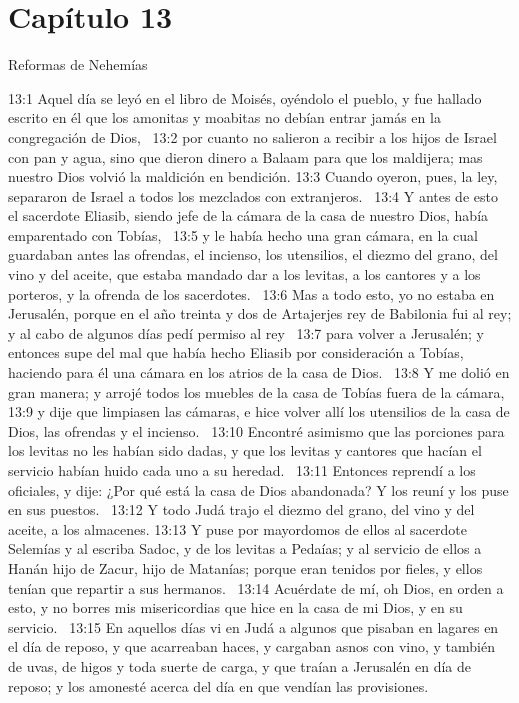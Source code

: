 \section*{Capítulo 13}
Reformas de Nehemías  

13:1 Aquel día se leyó en el libro de Moisés, oyéndolo el pueblo, y fue hallado escrito en él que los amonitas y moabitas no debían entrar jamás en la congregación de Dios,  
13:2 por cuanto no salieron a recibir a los hijos de Israel con pan y agua, sino que dieron dinero a Balaam para que los maldijera; mas nuestro Dios volvió la maldición en bendición. 
13:3 Cuando oyeron, pues, la ley, separaron de Israel a todos los mezclados con extranjeros.  
13:4 Y antes de esto el sacerdote Eliasib, siendo jefe de la cámara de la casa de nuestro Dios, había emparentado con Tobías,  
13:5 y le había hecho una gran cámara, en la cual guardaban antes las ofrendas, el incienso, los utensilios, el diezmo del grano, del vino y del aceite, que estaba mandado dar a los levitas, a los cantores y a los porteros, y la ofrenda de los sacerdotes.  
13:6 Mas a todo esto, yo no estaba en Jerusalén, porque en el año treinta y dos de Artajerjes rey de Babilonia fui al rey; y al cabo de algunos días pedí permiso al rey  
13:7 para volver a Jerusalén; y entonces supe del mal que había hecho Eliasib por consideración a Tobías, haciendo para él una cámara en los atrios de la casa de Dios.  
13:8 Y me dolió en gran manera; y arrojé todos los muebles de la casa de Tobías fuera de la cámara,  
13:9 y dije que limpiasen las cámaras, e hice volver allí los utensilios de la casa de Dios, las ofrendas y el incienso.  
13:10 Encontré asimismo que las porciones para los levitas no les habían sido dadas, y que los levitas y cantores que hacían el servicio habían huido cada uno a su heredad.  
13:11 Entonces reprendí a los oficiales, y dije: ¿Por qué está la casa de Dios abandonada? Y los reuní y los puse en sus puestos.  
13:12 Y todo Judá trajo el diezmo del grano, del vino y del aceite, a los almacenes. 
13:13 Y puse por mayordomos de ellos al sacerdote Selemías y al escriba Sadoc, y de los levitas a Pedaías; y al servicio de ellos a Hanán hijo de Zacur, hijo de Matanías; porque eran tenidos por fieles, y ellos tenían que repartir a sus hermanos.  
13:14 Acuérdate de mí, oh Dios, en orden a esto, y no borres mis misericordias que hice en la casa de mi Dios, y en su servicio.  
13:15 En aquellos días vi en Judá a algunos que pisaban en lagares en el día de reposo, y que acarreaban haces, y cargaban asnos con vino, y también de uvas, de higos y toda suerte de carga, y que traían a Jerusalén en día de reposo; y los amonesté acerca del día en que vendían las provisiones.  
